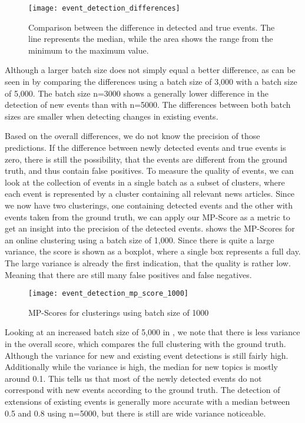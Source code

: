 \begin{figure}[h]
    \centering
    \texttt{[image: event\_detection\_differences]}
    \caption{
        Comparison between the difference in detected and true events.
        The line represents the median, while the area shows the range from the minimum to the maximum value.
    }
    \label{fig:event_detection_differences}
\end{figure}

Although a larger batch size does not simply equal a better difference,
as can be seen in 
by comparing the differences using a batch size of 3,000 with a batch size of 5,000.
The batch size n=3000 shows a generally lower difference in the detection of new events than with n=5000.
The differences between both batch sizes are smaller when detecting changes in existing events.

Based on the overall differences, we do not know the precision of those predictions.
If the difference between newly detected events and true events is zero,
there is still the possibility, that the events are different from the ground truth,
and thus contain false positives.
To measure the quality of events, we can look at the collection of events in a single batch as a subset of clusters,
where each event is represented by a cluster containing all relevant news articles.
Since we now have two clusterings, one containing detected events and the other with events taken from the ground truth,
we can apply our MP-Score as a metric to get an insight into the precision of the detected events.
 shows the MP-Scores for an online clustering using a batch size of 1,000.
Since there is quite a large variance, the score is shown as a boxplot, where a single box represents a full day.
The large variance is already the first indication, that the quality is rather low.
Meaning that there are still many false positives and false negatives.

\begin{figure}[h]
    \centering
    \texttt{[image: event\_detection\_mp\_score\_1000]}
    \caption{MP-Scores for clusterings using batch size of 1000}
    \label{fig:event_detection_mp_score_1000}
\end{figure}

Looking at an increased batch size of 5,000 in ,
we note that there is less variance in the overall score, which compares the full clustering with the ground truth.
Although the variance for new and existing event detections is still fairly high.
Additionally while the variance is high, the median for new topics is mostly around 0.1.
This tells us that most of the newly detected events do not correspond with new events according to the ground truth.
The detection of extensions of existing events is generally more accurate
with a median between 0.5 and 0.8 using n=5000, but there is still are wide variance noticeable.


